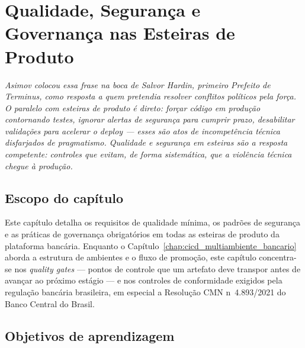 \chapter{Qualidade, Seguran\c{c}a e Governan\c{c}a nas Esteiras de Produto}
\label{chap:qualidade_seguranca_esteiras}

{\small\itshape\color{AccentGray}
Asimov colocou essa frase na boca de Salvor Hardin, primeiro Prefeito de Terminus, como resposta a quem pretendia resolver conflitos pol\'{i}ticos pela for\c{c}a. O paralelo com esteiras de produto \'{e} direto: for\c{c}ar c\'{o}digo em produ\c{c}\~ao contornando testes, ignorar alertas de seguran\c{c}a para cumprir prazo, desabilitar valida\c{c}\~oes para acelerar o \textit{deploy} --- esses s\~ao atos de incompet\^encia t\'{e}cnica disfarjados de pragmatismo. Qualidade e seguran\c{c}a em esteiras s\~ao a resposta competente: controles que evitam, de forma sistem\'{a}tica, que a viol\^encia t\'{e}cnica chegue \`a produ\c{c}\~ao.\par}
\vspace{0.6em}
\section{Escopo do cap\'itulo}

Este cap\'itulo detalha os requisitos de qualidade m\'inima, os padr\~oes de
seguran\c{c}a e as pr\'aticas de governan\c{c}a
obrigat\'orios em todas as esteiras de produto da plataforma banc\'aria. Enquanto
o Cap\'itulo~\ref{chap:cicd_multiambiente_bancario} aborda a estrutura de
ambientes e o fluxo de promo\c{c}\~ao, este cap\'itulo concentra-se nos
\textit{quality gates} --- pontos de controle que
um artefato deve transpor antes de avan\c{c}ar ao pr\'oximo est\'agio ---
e nos controles de conformidade exigidos pela regula\c{c}\~ao banc\'aria
brasileira, em especial a Resolu\c{c}\~ao CMN n\textordmasculine~4.893/2021
do Banco Central do Brasil.

\section{Objetivos de aprendizagem}


